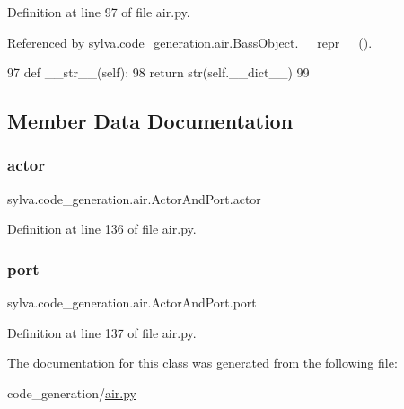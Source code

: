 Definition at line 97 of file air.\+py.



Referenced by sylva.\+code\+\_\+generation.\+air.\+Bass\+Object.\+\_\+\+\_\+repr\+\_\+\+\_\+().


\begin{DoxyCode}
97     \textcolor{keyword}{def }\_\_str\_\_(self):
98         \textcolor{keywordflow}{return} str(self.\_\_dict\_\_)
99 
\end{DoxyCode}


\subsection{Member Data Documentation}
\mbox{\label{classsylva_1_1code__generation_1_1air_1_1_actor_and_port_ae75bb4b57c6e2238f8f2fdadbc52311a}} 
\subsubsection{\texorpdfstring{actor}{actor}}
{\footnotesize\ttfamily sylva.\+code\+\_\+generation.\+air.\+Actor\+And\+Port.\+actor}



Definition at line 136 of file air.\+py.

\mbox{\label{classsylva_1_1code__generation_1_1air_1_1_actor_and_port_a2401a1fc2b007251a2ed4918b484d687}} 
\subsubsection{\texorpdfstring{port}{port}}
{\footnotesize\ttfamily sylva.\+code\+\_\+generation.\+air.\+Actor\+And\+Port.\+port}



Definition at line 137 of file air.\+py.



The documentation for this class was generated from the following file\+:\begin{DoxyCompactItemize}
\item 
code\+\_\+generation/\hyperlink{air_8py}{air.\+py}\end{DoxyCompactItemize}
